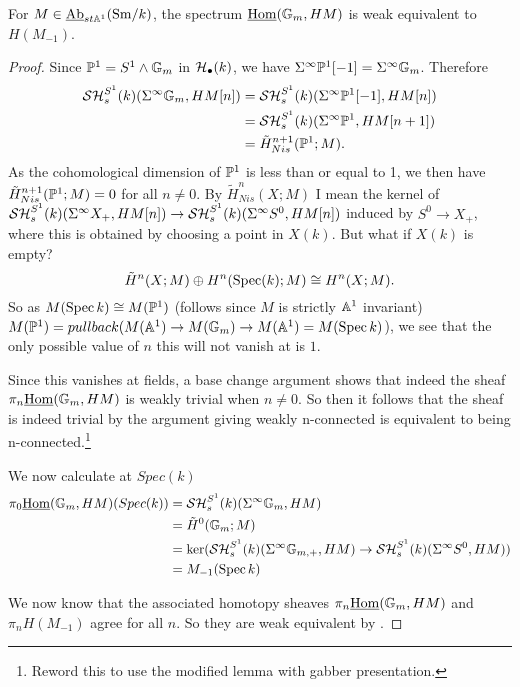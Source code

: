 \documentclass{amsart}%
\begin{document}
\begin{proposition}
  For $M \in \operatorname{\underline{Ab}}_{st\mathbb{A}^1}(\mathrm{Sm}/k)$, the spectrum
  $\underline{\operatorname{Hom}}(\mathbb{G}_m, HM)$ is weak equivalent to $H(M_{-1})$.
\end{proposition}

\begin{proof}
  Since $\mathbb{P}^1 = S^1 \wedge \mathbb{G}_m$ in $\mathcal{H}_{\bullet}(k)$, we have
  $\Sigma^{\infty} \mathbb{P}^1 [-1] = \Sigma^{\infty} \mathbb{G}_m$. Therefore 
  \begin{align*}
    \mathcal{SH}^{S^1}_s(k)(\Sigma^{\infty}\mathbb{G}_m, HM[n]) & = \mathcal{SH}^{S^1}_s(k)(\Sigma^{\infty}\mathbb{P}^1 [-1], HM[n]) \\
    & = \mathcal{SH}^{S^1}_s(k)(\Sigma^{\infty}\mathbb{P}^1, HM[n+1])\\
    & = \tilde{H}^{n+1}_{Nis}(\mathbb{P}^1;M).
  \end{align*}
  As the cohomological dimension of $\mathbb{P}^1$ is less than or equal to
  1, we then have $\tilde{H}^{n+1}_{Nis}(\mathbb{P}^1;M) = 0$ for all
  $n \neq 0$. By $\tilde{H}^{n}_{Nis}(X;M)$ I mean the kernel of
  $ \mathcal{SH}^{S^1}_s(k)(\Sigma^{\infty}X_+, HM[n]) \to
  \mathcal{SH}^{S^1}_s(k)(\Sigma^{\infty}S^0, HM[n])$
  induced by $S^0 \to X_+$, where this is obtained by choosing a point
  in $X(k)$. But what if $X(k)$ is empty?
  \begin{equation*}
    \tilde{H}^n(X;M) \oplus H^n(\operatorname{Spec}(k);M) \cong H^n(X;M).
  \end{equation*}
  So as $M(\operatorname{Spec} k) \cong M(\mathbb{P}^1)$ (follows since $M$ is strictly
  $\mathbb{A}^1$ invariant)
  $M(\mathbb{P}^1) = pullback( M(\mathbb{A}^1)\to M(\mathbb{G}_m) \rightarrow M(\mathbb{A}^1)
  = M(\operatorname{Spec} k)$),
  we see that the only possible value of $n$ this will not vanish at
  is $1$.
  
  Since this vanishes at fields, a base change argument shows that
  indeed the sheaf $\pi_n \underline{\operatorname{Hom}}(\mathbb{G}_m, HM)$ is weakly
  trivial when $n\neq 0$. So then it follows that the sheaf is indeed
  trivial by the argument giving weakly n-connected is equivalent to
  being n-connected.\footnote{Reword this to use the modified lemma
    with gabber presentation.}

  We now calculate at $Spec(k)$
  \begin{align*}
    \pi_0 \underline{\operatorname{Hom}}(\mathbb{G}_m, HM)(Spec(k))    
    & = \mathcal{SH}^{S^1}_s(k)(\Sigma^{\infty}\mathbb{G}_m, HM) \\
    & = \tilde{H}^0(\mathbb{G}_m; M) \\
    & = \ker( \mathcal{SH}^{S^1}_s(k)(\Sigma^{\infty}\mathbb{G}_{m,+}, HM) \to \mathcal{SH}^{S^1}_s(k)(\Sigma^{\infty}S^0, HM) )\\
    & = M_{-1}(\operatorname{Spec} k)
  \end{align*}

  We now know that the associated homotopy sheaves
  $\pi_n \underline{\operatorname{Hom}}(\mathbb{G}_m, HM)$ and $\pi_nH(M_{-1})$ agree for
  all $n$. So they are weak equivalent by \cite[Lemma 3.2.5]{Mor05}.
\end{proof}
\end{document}
